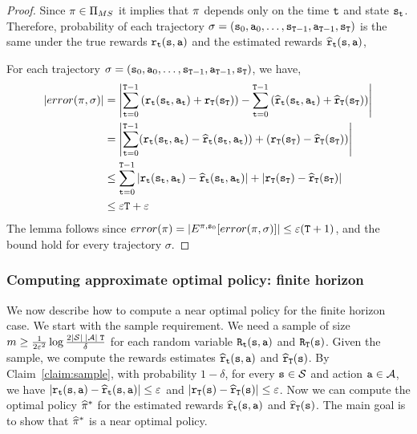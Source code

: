 \begin{proof}
Since $\pi\in  {\Pi _{MS}}$ it implies that $\pi$ depends
only on the time ${\tt t}$ and state ${\tt s}_{\tt t}$.
%
Therefore, probability of each trajectory
$\sigma=({\tt s}_0,{\tt a}_0,\ldots,
{\tt s}_{{\tt T}-1},{\tt a}_{{\tt T}-1},{\tt s}_{\tt T})$ is the
same under the true rewards ${\tt r}_{\tt t}({\tt s},{\tt a})$ and the
estimated rewards $\widehat{{\tt r}}_{\tt t}({\tt s},{\tt a})$,

For each trajectory $\sigma=({\tt s}_0,{\tt a}_0,\ldots,
{\tt s}_{{\tt T}-1},{\tt a}_{{\tt T}-1},{\tt s}_{\tt T})$, we
have,
\begin{align*}
\left|error(\pi,\sigma)\right| &= \left|\sum_{{\tt t}=0}^{{\tt T}-1}
\left({\tt r}_{\tt t}({\tt s}_{\tt t},{\tt a}_{\tt t})+{\tt r}_{\tt T}({\tt s}_{\tt T})\right)
-\sum_{{\tt t}=0}^{{\tt T}-1}
\left(\widehat{{\tt r}}_{\tt t}({\tt s}_{\tt t},{\tt a}_{\tt t})+\widehat{{\tt r}}_{\tt T}({\tt s}_{\tt T})\right)\right| \\
&= \left|\sum_{{\tt t}=0}^{{\tt T}-1}
({\tt r}_{\tt t}({\tt s}_{\tt t},{\tt a}_{\tt t})-\widehat{{\tt r}}_{\tt t}({\tt s}_{\tt t},{\tt a}_{\tt t}))
+
({\tt r}_{\tt T}({\tt s}_{\tt T})-\widehat{{\tt r}}_{\tt T}({\tt s}_{\tt T}))\right|\\
&\leq \sum_{{\tt t}=0}^{{\tt T}-1}
|{\tt r}_{\tt t}({\tt s}_{\tt t},{\tt a}_{\tt t})-\widehat{{\tt r}}_{\tt t}({\tt s}_{\tt t},{\tt a}_{\tt t})|
+
|{\tt r}_{\tt T}({\tt s}_{\tt T})-\widehat{{\tt r}}_{\tt T}({\tt s}_{\tt T})|\\
&\leq \varepsilon {\tt T} +\varepsilon
\end{align*}
The lemma follows since
$error(\pi)=|E^{\pi,{\tt s}_0}[error(\pi,\sigma)]|\leq
\varepsilon({\tt T}+1)$, and the bound hold for every trajectory
$\sigma$.
\end{proof}

\subsubsection{Computing approximate optimal policy: finite horizon}

We now describe how to compute a near optimal policy for the finite
horizon case. We start with the sample requirement. We need a sample
of size $m\geq \frac{1}{2\varepsilon^2}\log
\frac{2|\mathcal{S}|\;|\mathcal{A}|\; {\tt T}}{\delta}$ for each random
variable ${\tt R}_{\tt t}({\tt s},{\tt a})$ and
${\tt R}_{\tt T}({\tt s})$. Given the sample, we compute the
rewards estimates $\widehat{{\tt r}}_{\tt t}({\tt s},{\tt a})$ and
$\widehat{{\tt r}}_{\tt T}({\tt s})$. By Claim~\ref{claim:sample},
with probability $1-\delta$, for every ${\tt s}\in\mathcal{S}$ and action
${\tt a} \in\mathcal{A}$, we have
$|{\tt r}_{\tt t}({\tt s},{\tt a})-\widehat{{\tt r}}_{\tt t}({\tt s},{\tt a})|\leq
\varepsilon$ and
$|{\tt r}_{\tt T}({\tt s})-\widehat{{\tt r}}_{\tt T}({\tt s})|\leq\varepsilon$.
Now we can compute the optimal policy $\widehat{\pi}^*$ for the
estimated rewards $\widehat{{\tt r}}_{\tt t}({\tt s},{\tt a})$ and
$\widehat{{\tt r}}_{\tt T}({\tt s})$. The main goal is to show that
$\widehat{\pi}^*$ is a near optimal policy.

